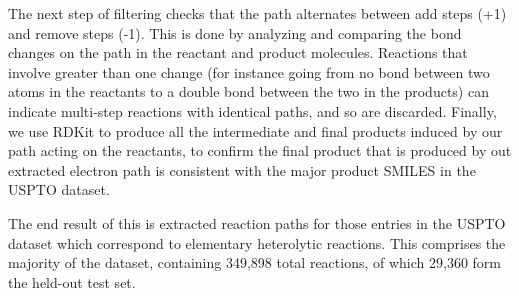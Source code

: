 The next step of filtering checks that the path alternates between add steps (+1) and remove steps (-1). 
This is done by analyzing and comparing the bond changes on the path in the reactant and product molecules. 
Reactions that involve greater than one change (for instance going from no bond between two atoms in the reactants to a double bond between the two in the products) can indicate multi-step 
reactions with identical paths, and so are discarded.
Finally, we use RDKit to produce all the intermediate and final products induced by our path acting on the reactants,
to confirm the final product that is produced by out extracted electron path is consistent with the major product SMILES in the USPTO dataset.

The end result of this is extracted reaction paths for those entries in the USPTO dataset which 
correspond to elementary heterolytic reactions.
This comprises the majority of the dataset, containing 349,898 total reactions, of which 29,360 form the held-out test set.


